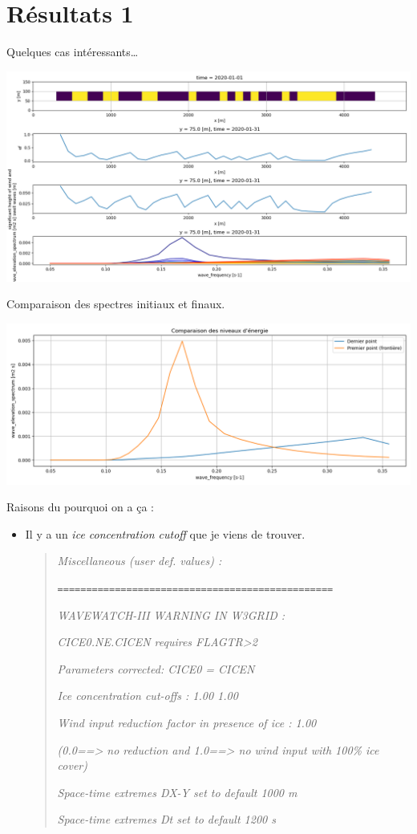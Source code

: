 \documentclass[10pt]{article}
\numberwithin{equation}{section}
\begin{document}
\section{Résultats 1}
\label{sec:orgf14ba75}
Quelques cas intéressants\ldots{}

\begin{center}
\includegraphics[width=.9\linewidth]{Figures/figures/analyse_spec_ww3_001.png}
\end{center}

Comparaison des spectres initiaux et finaux. 

\begin{center}
\includegraphics[width=.9\linewidth]{Figures/figures/spectre001.png}
\end{center}

Raisons du pourquoi on a ça : 
\begin{itemize}
\item Il y a un \emph{ice concentration cutoff} que je viens de trouver.
\begin{quote}
\emph{Miscellaneous (user def. values) :}

\texttt{================================================}

\emph{WAVEWATCH-III WARNING IN W3GRID :}

\emph{CICE0.NE.CICEN requires FLAGTR>2}

\emph{Parameters corrected: CICE0 = CICEN}

\emph{Ice concentration cut-offs  :    1.00  1.00}

\emph{Wind input reduction factor in presence of ice :  1.00}

\emph{(0.0==> no reduction and 1.0==> no wind input with 100\% ice cover)}

\emph{Space-time extremes DX-Y set to default 1000 m}

\emph{Space-time extremes Dt set to default 1200 s}
\end{quote}
\end{itemize}
\end{document}
